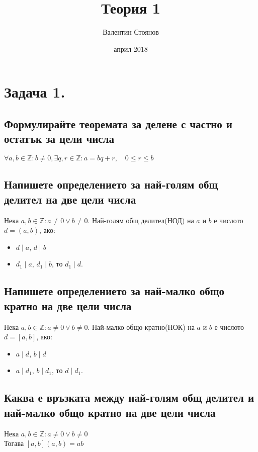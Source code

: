 \documentclass[12pt]{article}
\newcommand*{\Z}{\mathbb{Z}}
\begin{document}
\title{Теория 1}
\author{Валентин Стоянов}
\date{април 2018}
\maketitle

\section*{Задача 1.}

\subsection*{Формулирайте теоремата за делене с частно и остатък за цели числа}
$\forall a, b \in \Z: b \neq 0, \exists q, r \in \Z: a = bq + r, \quad 0 \leq r \leq b$

\subsection*{Напишете определението за най-голям общ делител на две цели числа}
Нека $a, b \in \Z: a \neq 0 \vee b \neq 0$. Най-голям общ делител(НОД) на $a$ и $b$ е числото $d = (a, b)$, ако:
\begin{itemize}
	\item $d \mid a$, $d \mid b$
	\item $d_1 \mid a$, $d_1 \mid b$, то $d_1 \mid d$.
\end{itemize}

\subsection*{Напишете определението за най-малко общо кратно на две цели числа}
Нека $a, b \in \Z: a \neq 0 \vee b \neq 0$. Най-малко общо кратно(НОК) на $a$ и $b$ е числото $d = [a, b]$, ако:
\begin{itemize}
	\item $a \mid d$, $b \mid d$
	\item $a \mid d_1$, $b \mid d_1$, то $d \mid d_1$.
\end{itemize}

\subsection*{Каква е връзката между най-голям общ делител и най-малко общо кратно на две цели числа}
Нека $a, b \in \Z: a \neq 0 \vee b \neq 0$\\
Тогава $[a, b](a, b) = ab$
\end{document}
